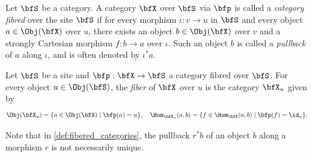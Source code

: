     \begin{definition}%
        Let \(\bfS\) be a category.
        A category \(\bfX\) over \(\bfS\) via \(\bfp\) is called a \emph{category fibred} over the site \(\bfS\) if
        for every morphism \(\iota: v\to u\) in \(\bfS\) and every object \(a \in \Obj(\bfX)\) over \(u\), there exists an object \(b \in \Obj(\bfX)\) over \(v\) and a strongly Cartesian morphism \(f: b \to a\) over \(\iota\).
        Such an object \(b\) is called a \emph{pullback} of \(a\) along \(\iota\), and is often denoted by \(\iota^*a\).
    \end{definition}

    \begin{definition}%
        Let \(\bfS\) be a site and \(\bfp: \bfX \to \bfS\) a category fibred over \(\bfS\).
        For every object \(u \in \Obj(\bfS)\), the \emph{fiber} of \(\bfX\) over \(u\) is the category \(\bfX_u\) given by
        \[ \Obj(\bfX_u) = \{ a \in \Obj(\bfX) \mid \bfp(a) = u \}, \quad \Hom_{\bfX_u}(a,b) = \{ f \in \Hom_{\bfX}(a,b) \mid \bfp(f) = \id_u \}. \]
    \end{definition}

    \begin{remark}%
        Note that in \cref{def:fibered_categories}, the pullback \(r^*b\) of an object \(b\) along a morphism \(r\) is not necessarily unique.
    \end{remark}


